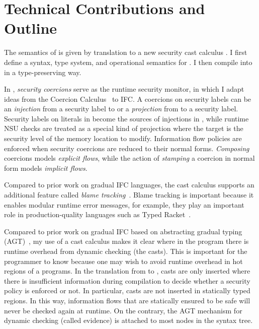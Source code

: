 \vspace{20pt}

\section{Technical Contributions and Outline}

The semantics of \Surface is given by translation to a new security cast
calculus \CC. I first define a syntax, type system, and operational semantics
for \CC. I then compile \Surface into \CC in a type-preserving way.

In \CC, \textit{security coercions} serve as the runtime security monitor, in
which I adapt ideas from the Coercion
Calculus~\parencite{Henglein:1994nz,Herman:2010aa} to IFC. A coercions on
security labels can be an \textit{injection} from a security label to \unk or a
\textit{projection} from \unk to a security label. Security labels on literals
in \Surface become the sources of injections in \CC, while runtime NSU checks
are treated as a special kind of projection where the target is the security
level of the memory location to modify. Information flow policies are enforced
when security coercions are reduced to their normal forms. \textit{Composing}
coercions models \textit{explicit flows}, while the action of \textit{stamping}
a coercion in normal form models \textit{implicit flows}.

Compared to prior work on gradual IFC languages, the \CC cast calculus supports
an additional feature called \textit{blame tracking}~\parencite{Findler:2002eu}.
Blame tracking is important because it enables modular runtime error messages,
for example, they play an important role in production-quality languages such as
Typed Racket~\parencite{Tobin-Hochstadt:2008lr,Preston-Tunnell-Wilson:2018aa}.

Compared to prior work on gradual IFC based on abstracting gradual typing
(AGT)~\parencite{Toro:2018aa}, my use of a cast calculus makes it clear where
in the program there is runtime overhead from dynamic checking (the casts). This
is important for the programmer to know because one may wish to avoid runtime
overhead in hot regions of a programs. In the translation from \Surface to \CC,
casts are only inserted where there is insufficient information during
compilation to decide whether a security policy is enforced or not. In
particular, casts are not inserted in statically typed regions. In this way,
information flows that are statically ensured to be safe will never be checked
again at runtime. On the contrary, the AGT mechanism for dynamic checking
(called evidence) is attached to most nodes in the syntax tree.

